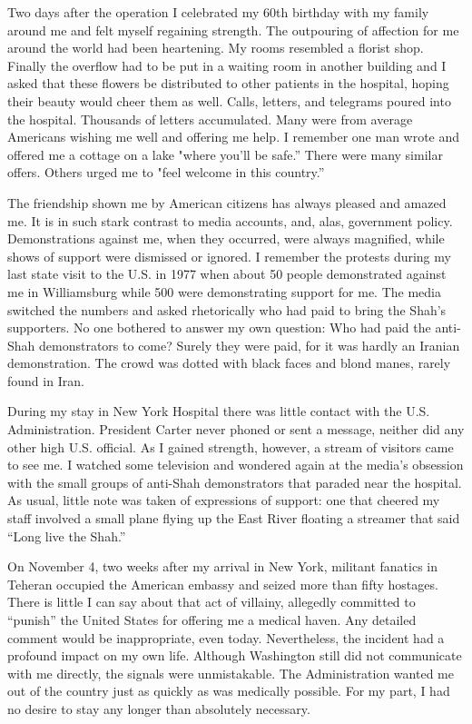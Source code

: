 Two days after the operation I celebrated my 60th birthday with my family around me and felt myself regaining strength. The outpouring of affection for me around the world had been heartening. My rooms resembled a florist shop. Finally the overflow had to be put in a waiting room in another building and I asked that these flowers be distributed to other patients in the hospital, hoping their beauty would cheer them as well. Calls, letters, and telegrams poured into the hospital. Thousands of letters accumulated. Many were from average Americans wishing me well and offering me help. I remember one man wrote and offered me a cottage on a lake "where you'll be safe.” There were many similar offers. Others urged me to "feel welcome in this country.” 

The friendship shown me by American citizens has always pleased and amazed me. It is in such stark contrast to media accounts, and, alas, government policy. Demonstrations against me, when they occurred, were always magnified, while shows of support were dismissed or ignored. I remember the protests during my last state visit to the U.S. in 1977 when about 50 people demonstrated against me in Williamsburg while 500 were demonstrating support for me. The media switched the numbers and asked rhetorically who had paid to bring the Shah's supporters. No one bothered to answer my own question: Who had paid the anti-Shah demonstrators to come? Surely they were paid, for it was hardly an Iranian demonstration. The crowd was dotted with black faces and blond manes, rarely found in Iran. 

During my stay in New York Hospital there was little contact with the U.S. Administration. President Carter never phoned or sent a message, neither did any other high U.S. official. As I gained strength, however, a stream of visitors came to see me. I watched some television and wondered again at the media's obsession with the small groups of anti-Shah demonstrators that paraded near the hospital. As usual, little note was taken of expressions of support: one that cheered my staff involved a small plane flying up the East River floating a streamer that said “Long live the Shah.” 

On November 4, two weeks after my arrival in New York, militant fanatics in Teheran occupied the American embassy and seized more than fifty hostages. There is little I can say about that act of villainy, allegedly committed to “punish” the United States for offering me a medical haven. Any detailed comment would be inappropriate, even today. Nevertheless, the incident had a profound impact on my own life. Although Washington still did not communicate with me directly, the signals were unmistakable. The Administration wanted me out of the country just as quickly as was medically possible. For my part, I had no desire to stay any longer than absolutely necessary. 

